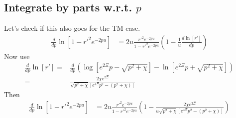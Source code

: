 \subsection{Integrate by parts w.r.t. $p$}
Let's check if this also goes for the TM case.  
\begin{align}
\frac{d}{dp}\ln[1-r'^2 e^{-2pu}] %
&= 2u\frac{r'^2 e^{-2pu}}{1-r'^2 e^{-2pu}}\left( 1 -\frac{1}{u} \frac{d\ln[r']}{dp}\right)
\end{align}
Now use 
\begin{align}
\frac{d}{dp}\ln[r'] =& \frac{d}{dp}\left(\log[e^{2\Xi}p - \sqrt{p^2+\chi}] -\ln[e^{2\Xi}p + \sqrt{p^2+\chi}]\right) \\
=& \frac{2\chi e^{2\Xi}}{\sqrt{p^2+\chi}[e^{4\Xi}p^2-(p^2+\chi)]}
\end{align}
Then 
\begin{align}
\frac{d}{dp}\ln[1-r'^2 e^{-2pu}] &= 
2u\frac{r'^2 e^{-2pu}}{1-r'^2 e^{-2pu}}\left( 1 -\frac{2\chi e^{2\Xi}}{u\sqrt{p^2+\chi}[e^{4\Xi}p^2-(p^2+\chi)]}\right)\label{eq:TM_integration_by_parts}
\end{align}

